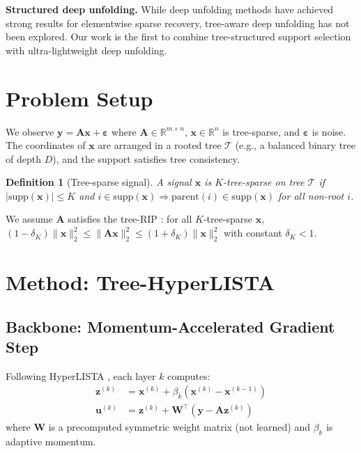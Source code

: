\documentclass{article}
\newtheorem{definition}{Definition}
\begin{document}
\textbf{Structured deep unfolding.} While deep unfolding methods have achieved strong results for elementwise sparse recovery, tree-aware deep unfolding has not been explored. Our work is the first to combine tree-structured support selection with ultra-lightweight deep unfolding.

\section{Problem Setup}

We observe $\mathbf{y} = \mathbf{A}\mathbf{x} + \boldsymbol{\varepsilon}$ where $\mathbf{A} \in \mathbb{R}^{m \times n}$, $\mathbf{x} \in \mathbb{R}^n$ is tree-sparse, and $\boldsymbol{\varepsilon}$ is noise. The coordinates of $\mathbf{x}$ are arranged in a rooted tree $\mathcal{T}$ (e.g., a balanced binary tree of depth $D$), and the support satisfies tree consistency.

\begin{definition}[Tree-sparse signal]
A signal $\mathbf{x}$ is $K$-tree-sparse on tree $\mathcal{T}$ if $|\mathrm{supp}(\mathbf{x})| \leq K$ and $i \in \mathrm{supp}(\mathbf{x}) \Rightarrow \mathrm{parent}(i) \in \mathrm{supp}(\mathbf{x})$ for all non-root $i$.
\end{definition}

We assume $\mathbf{A}$ satisfies the tree-RIP \cite{baraniuk2010model}: for all $K$-tree-sparse $\mathbf{x}$, $(1-\delta_K)\|\mathbf{x}\|_2^2 \leq \|\mathbf{A}\mathbf{x}\|_2^2 \leq (1+\delta_K)\|\mathbf{x}\|_2^2$ with constant $\delta_K < 1$.

\section{Method: Tree-HyperLISTA}

\subsection{Backbone: Momentum-Accelerated Gradient Step}

Following HyperLISTA \cite{chen2021hyperlista}, each layer $k$ computes:
\begin{align}
    \mathbf{z}^{(k)} &= \mathbf{x}^{(k)} + \beta_k (\mathbf{x}^{(k)} - \mathbf{x}^{(k-1)}) \label{eq:momentum}\\
    \mathbf{u}^{(k)} &= \mathbf{z}^{(k)} + \mathbf{W}^\top (\mathbf{y} - \mathbf{A}\mathbf{z}^{(k)}) \label{eq:gradient}
\end{align}
where $\mathbf{W}$ is a precomputed symmetric weight matrix (not learned) and $\beta_k$ is adaptive momentum.
\end{document}
